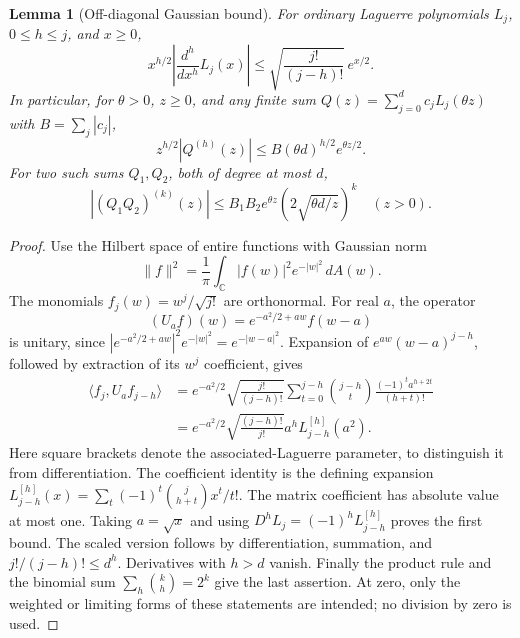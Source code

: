 \documentclass[11pt]{article}
\newtheorem{lemma}{Lemma}
\begin{document}
\begin{lemma}[Off-diagonal Gaussian bound]
For ordinary Laguerre polynomials $L_j$, $0\le h\le j$, and $x\ge0$,
\[
 x^{h/2}\left|\frac{d^h}{dx^h}L_j(x)\right|
 \le\sqrt{\frac{j!}{(j-h)!}}\,e^{x/2}.
\]
In particular, for $\theta>0$, $z\ge0$, and any finite sum
$Q(z)=\sum_{j=0}^d c_jL_j(\theta z)$ with
$B=\sum_j|c_j|$,
\[
 z^{h/2}|Q^{(h)}(z)|\le B(\theta d)^{h/2}e^{\theta z/2}.
\]
For two such sums $Q_1,Q_2$, both of degree at most $d$,
\[
 |(Q_1Q_2)^{(k)}(z)|
 \le B_1B_2 e^{\theta z}
                \left(2\sqrt{\theta d/z}\right)^k
 \quad(z>0).
\]
\end{lemma}
\begin{proof}
Use the Hilbert space of entire functions with Gaussian norm
\[
 \|f\|^2=\frac1\pi\int_{\mathbb C}|f(w)|^2e^{-|w|^2}\,dA(w).
\]
The monomials $f_j(w)=w^j/\sqrt{j!}$ are orthonormal. For real $a$,
the operator
\[
 (U_af)(w)=e^{-a^2/2+aw}f(w-a)
\]
is unitary, since
$|e^{-a^2/2+aw}|^2e^{-|w|^2}=e^{-|w-a|^2}$.
Expansion of $e^{aw}(w-a)^{j-h}$, followed by extraction of its
$w^j$ coefficient, gives
\begin{align*}
 \langle f_j,U_af_{j-h}\rangle
 &=e^{-a^2/2}\sqrt{\frac{j!}{(j-h)!}}
   \sum_{t=0}^{j-h}\binom{j-h}{t}
        \frac{(-1)^t a^{h+2t}}{(h+t)!}\\
 &=e^{-a^2/2}\sqrt{\frac{(j-h)!}{j!}}
       a^h L_{j-h}^{[h]}(a^2).
\end{align*}
Here square brackets denote the associated-Laguerre parameter,
to distinguish it from differentiation. The coefficient identity is
the defining expansion
$L_{j-h}^{[h]}(x)=\sum_t(-1)^t\binom{j}{h+t}x^t/t!$.
The matrix coefficient has absolute value at most one. Taking
$a=\sqrt{x}$ and using
$D^h L_j=(-1)^hL_{j-h}^{[h]}$ proves the first bound.
The scaled version follows by differentiation, summation, and
$j!/(j-h)!\le d^h$. Derivatives with $h>d$ vanish.
Finally the product rule and the binomial sum $\sum_h\binom kh=2^k$
give the last assertion. At zero, only the weighted or limiting forms
of these statements are intended; no division by zero is used.
\end{proof}
\end{document}
